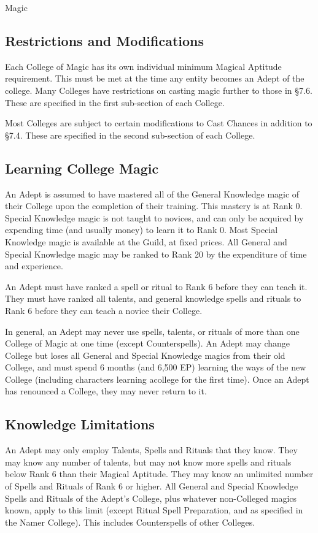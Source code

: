 \begin{Chapter}{Magic}
\subsection{Restrictions and Modifications}

Each College of Magic has its own individual minimum Magical Aptitude
requirement.  This must be met at the time any entity becomes an Adept
of the college.  Many Colleges have restrictions on casting magic
further to those in §7.6.  These are specified in the first
sub-section of each College.

Most Colleges are subject to certain modifications to Cast Chances in
addition to §7.4.  These are specified in the second sub-section of
each College.

\subsection{Learning College Magic}

An Adept is assumed to have mastered all of the General Knowledge
magic of their College upon the completion of their training. This
mastery is at Rank 0. Special Knowledge magic is not taught to
novices, and can only be acquired by expending time (and usually
money) to learn it to Rank 0.  Most Special Knowledge magic is
available at the Guild, at fixed prices.  All General and Special
Knowledge magic may be ranked to Rank 20 by the expenditure of time
and experience.

An Adept must have ranked a spell or ritual to Rank 6 before they can
teach it.  They must have ranked all talents, and general knowledge
spells and rituals to Rank 6 before they can teach a novice their
College.

In general, an Adept may never use spells, talents, or rituals of more
than one College of Magic at one time (except Counterspells). An Adept
may change College but loses all General and Special Knowledge magics
from their old College, and must spend 6 months (and 6,500 EP)
learning the ways of the new College (including characters learning
acollege for the first time).  Once an Adept has renounced a College,
they may never return to it.

\subsection{Knowledge Limitations}

An Adept may only employ Talents, Spells and Rituals that they
know. They may know any number of talents, but may not know more
spells and rituals below Rank 6 than their Magical Aptitude.  They may
know an unlimited number of Spells and Rituals of Rank 6 or higher.
All General and Special Knowledge Spells and Rituals of the Adept’s
College, plus whatever non-Colleged magics known, apply to this limit
(except Ritual Spell Preparation, and as specified in the Namer
College).  This includes Counterspells of other Colleges.


\end{Chapter}
